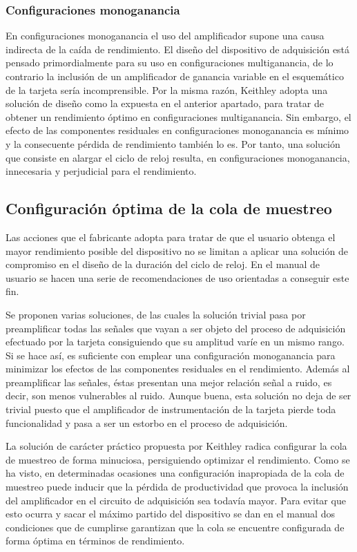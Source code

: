 \subsubsection{Configuraciones monoganancia}

En configuraciones monoganancia el uso del amplificador supone una causa indirecta de la caída de rendimiento. El diseño del dispositivo de adquisición está pensado primordialmente para su uso en configuraciones multiganancia, de lo contrario la inclusión de un amplificador de ganancia variable en el esquemático de la tarjeta sería incomprensible. Por la misma razón, Keithley adopta una solución de diseño como la expuesta en el anterior apartado, para tratar de obtener un rendimiento óptimo en configuraciones multiganancia. Sin embargo, el efecto de las componentes residuales en configuraciones monoganancia es mínimo y la consecuente pérdida de rendimiento también lo es. Por tanto, una solución que consiste en alargar el ciclo de reloj resulta, en configuraciones monoganancia, innecesaria y perjudicial para el rendimiento.


\subsection{Configuración óptima de la cola de muestreo}

Las acciones que el fabricante adopta para tratar de que el usuario obtenga el mayor rendimiento posible del dispositivo no se limitan a aplicar una solución de compromiso en el diseño de la duración del ciclo de reloj. En el manual de usuario se hacen una serie de recomendaciones de uso orientadas a conseguir este fin.\par
Se proponen varias soluciones, de las cuales la solución trivial pasa por preamplificar todas las señales que vayan a ser objeto del proceso de adquisición efectuado por la tarjeta consiguiendo que su amplitud varíe en un mismo rango. Si se hace así, es suficiente con emplear una configuración monoganancia para minimizar los efectos de las componentes residuales en el rendimiento. Además al preamplificar las señales, éstas presentan una mejor relación señal a ruido, es decir, son menos vulnerables al ruido. Aunque buena, esta solución no deja de ser trivial puesto que el amplificador de instrumentación de la tarjeta pierde toda funcionalidad y pasa a ser un estorbo en el proceso de adquisición.\par
La solución de carácter práctico propuesta por Keithley radica configurar la cola de muestreo de forma minuciosa, persiguiendo optimizar el rendimiento. Como se ha visto, en determinadas ocasiones una configuración inapropiada de la cola de muestreo puede inducir que la pérdida de productividad que provoca la inclusión del amplificador en el circuito de adquisición sea todavía mayor. Para evitar que esto ocurra y sacar el máximo partido del dispositivo se dan en el manual dos condiciones que de cumplirse garantizan que la cola se encuentre configurada de forma óptima en términos de rendimiento.


